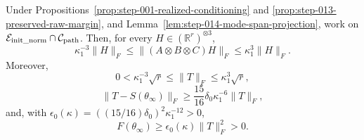 \begin{proposition}
\label{prop:step-014-positive-physical-loss}
\leavevmode\par\noindent
Under Propositions~\ref{prop:step-001-realized-conditioning} and
\ref{prop:step-013-preserved-raw-margin}, and
Lemma~\ref{lem:step-014-mode-span-projection}, work on
\(\mathcal E_{\rm init\_norm}\cap\mathcal C_{\rm path}\). Then, for every
\(H\in(\mathbb R^r)^{\otimes3}\),
\begin{equation}
  \kappa_1^{-3}\|H\|_F
  \le\|(A\otimes B\otimes C)H\|_F
  \le\kappa_1^3\|H\|_F.                                  \label{eq:step-014-7}
\end{equation}
Moreover,
\begin{equation}
  0<\kappa_1^{-3}\sqrt r\le\|T\|_F\le\kappa_1^3\sqrt r,
  \label{eq:step-014-target-norm-conclusion}
\end{equation}
\begin{equation}
  \|T-S(\theta_\infty)\|_F
  \ge\frac{15}{16}\delta_0\kappa_1^{-6}\|T\|_F,
  \label{eq:step-014-relative-residual-conclusion}
\end{equation}
and, with
\(\epsilon_0(\kappa)=((15/16)\delta_0)^2\kappa_1^{-12}>0\),
\begin{equation}
  F(\theta_\infty)
  \ge\epsilon_0(\kappa)\|T\|_F^2>0.
  \label{eq:step-014-positive-loss-conclusion}
\end{equation}

\end{proposition}

